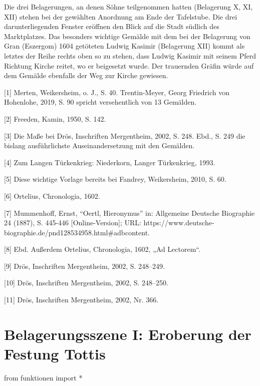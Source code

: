 \documentclass[
  a4paper,
  portrait]{book}
\newenvironment{Shaded}{\begin{snugshade}}{\end{snugshade}}
\newcommand{\ImportTok}[1]{\textcolor[rgb]{0.00,0.46,0.62}{#1}}
\newcommand{\NormalTok}[1]{\textcolor[rgb]{0.00,0.23,0.31}{#1}}
\newcommand{\OperatorTok}[1]{\textcolor[rgb]{0.37,0.37,0.37}{#1}}
\begin{document}
Die drei Belagerungen, an denen Söhne teilgenommen hatten (Belagerung X,
XI, XII) stehen bei der gewählten Anordnung am Ende der Tafelstube. Die
drei darunterliegenden Fenster eröffnen den Blick auf die Stadt südlich
des Marktplatzes. Das besonders wichtige Gemälde mit dem bei der
Belagerung von Gran (Eszergom) 1604 getöteten Ludwig Kasimir (Belagerung
XII) kommt als letztes der Reihe rechts oben so zu stehen, dass Ludwig
Kasimir mit seinem Pferd Richtung Kirche reitet, wo er beigesetzt wurde.
Der trauernden Gräfin würde auf dem Gemälde ebenfalls der Weg zur Kirche
gewiesen.

{[}1{]} Merten, Weikersheim, o. J., S. 40. Trentin-Meyer, Georg
Friedrich von Hohenlohe, 2019, S. 90 spricht versehentlich von 13
Gemälden.

{[}2{]} Freeden, Kamin, 1950, S. 142.

{[}3{]} Die Maße bei Drös, Inschriften Mergentheim, 2002, S. 248. Ebd.,
S. 249 die bislang ausführlichste Auseinandersetzung mit den Gemälden.

{[}4{]} Zum Langen Türkenkrieg: Niederkorn, Langer Türkenkrieg, 1993.

{[}5{]} Diese wichtige Vorlage bereits bei Fandrey, Weikersheim, 2010,
S. 60.

{[}6{]} Ortelius, Chronologia, 1602.

{[}7{]} Mummenhoff, Ernst, ``Oertl, Hieronymus'' in: Allgemeine Deutsche
Biographie 24 (1887), S. 445-446 {[}Online-Version{]}; URL:
https://www.deutsche-biographie.de/pnd128534958.html\#adbcontent.

{[}8{]} Ebd. Außerdem Ortelius, Chronologia, 1602, „Ad Lectorem``.

{[}9{]} Drös, Inschriften Mergentheim, 2002, S. 248--249.

{[}10{]} Drös, Inschriften Mergentheim, 2002, S. 248--250.

{[}11{]} Drös, Inschriften Mergentheim, 2002, Nr. 366.

\chapter{Belagerungsszene I: Eroberung der Festung
Tottis}\label{belagerungsszene-i-eroberung-der-festung-tottis}

\begin{Shaded}
\begin{Highlighting}[]
\ImportTok{from}\NormalTok{ funktionen }\ImportTok{import} \OperatorTok{*}
\end{Highlighting}
\end{Shaded}
\end{document}
